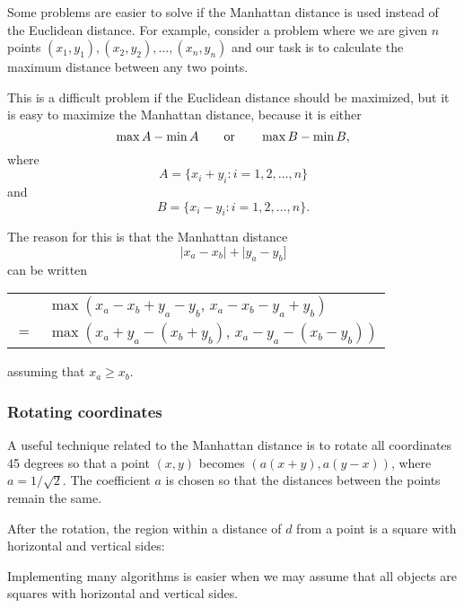 Some problems are easier to solve if the
Manhattan distance is used instead of the Euclidean distance.
For example, consider a problem where we are given
$n$ points $(x_1,y_1),(x_2,y_2),\ldots,(x_n,y_n)$
and our task is to calculate the maximum distance
between any two points.

This is a difficult problem if the Euclidean distance
should be maximized,
but it is easy to maximize the
Manhattan distance,
because it is either
\[\max A - \min A \hspace{20px} \textrm{or} \hspace{20px} \max B - \min B,\]
where
\[A = \{x_i+y_i : i = 1,2,\ldots,n\}\]
and
\[B = \{x_i-y_i : i = 1,2,\ldots,n\}.\]
\begin{samepage}
The reason for this is that the Manhattan distance
\[|x_a-x_b|+|y_a-y_b]\]
can be written
\begin{center}
\begin{tabular}{cl}
& $\max(x_a-x_b+y_a-y_b,\,x_a-x_b-y_a+y_b)$ \\
$=$ & $\max(x_a+y_a-(x_b+y_b),\,x_a-y_a-(x_b-y_b))$
\end{tabular}
\end{center}
assuming that $x_a \ge x_b$.
\end{samepage}

\begin{samepage}
\subsubsection{Rotating coordinates}

A useful technique related to the Manhattan distance
is to rotate all coordinates 45 degrees so that
a point $(x,y)$ becomes $(a(x+y),a(y-x))$,
where $a=1/\sqrt{2}$.
The coefficient $a$ is chosen so that
the distances between the points remain the same.

After the rotation, the region within a distance of $d$
from a point is a square with horizontal and vertical sides:
\begin{center}
\end{center}
\end{samepage}

Implementing many algorithms is easier when we may assume that all
objects are squares with horizontal and vertical sides.